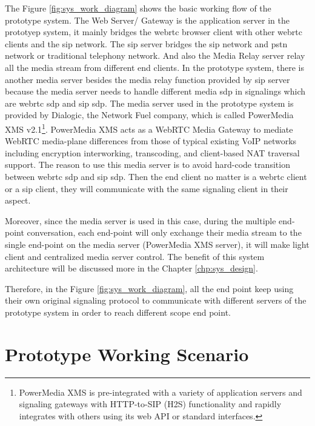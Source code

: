 \par The Figure \ref{fig:sys_work_diagram} shows the basic working flow of the prototype system. The Web Server/ Gateway is the application server in the prototyep system, it mainly bridges the \gls{webrtc} browser client with other \gls{webrtc} clients and the \gls{sip} network. The \gls{sip} server bridges the \gls{sip} network and \gls{pstn} network or traditional telephony network. And also the Media Relay server relay all the media stream from different end clients. In the prototype system, there is another media server besides the media relay function provided by \gls{sip} server because the media server needs to handle different media \gls{sdp} in signalings which are \gls{webrtc} \gls{sdp} and \gls{sip} \gls{sdp}. The media server used in the prototype system is provided by Dialogic, the Network Fuel company, which is called PowerMedia XMS v2.1\footnote{PowerMedia XMS is pre-integrated with a variety of application servers and signaling gateways with HTTP-to-SIP (H2S) functionality and rapidly integrates with others using its web API or standard interfaces.}. PowerMedia XMS acts as a WebRTC Media Gateway to mediate WebRTC media-plane differences from those of typical existing VoIP networks including encryption interworking, transcoding, and client-based NAT traversal support. The reason to use this media server is to avoid hard-code transition between \gls{webrtc} \gls{sdp} and \gls{sip} \gls{sdp}. Then the end client no matter is a \gls{webrtc} client or a \gls{sip} client, they will communicate with the same signaling client in their aspect.

\par Moreover, since the media server is used in this case, during the multiple end-point conversation, each end-point will only exchange their media stream to the single end-point on the media server (PowerMedia XMS server), it will make light client and centralized media server control. The benefit of this system architecture will be discussed more in the Chapter \ref{chp:sys_design}.

\par Therefore, in the Figure \ref{fig:sys_work_diagram}, all the end point keep using their own original signaling protocol to communicate with different servers of the prototype system in order to reach different scope end point.

\section{Prototype Working Scenario}

